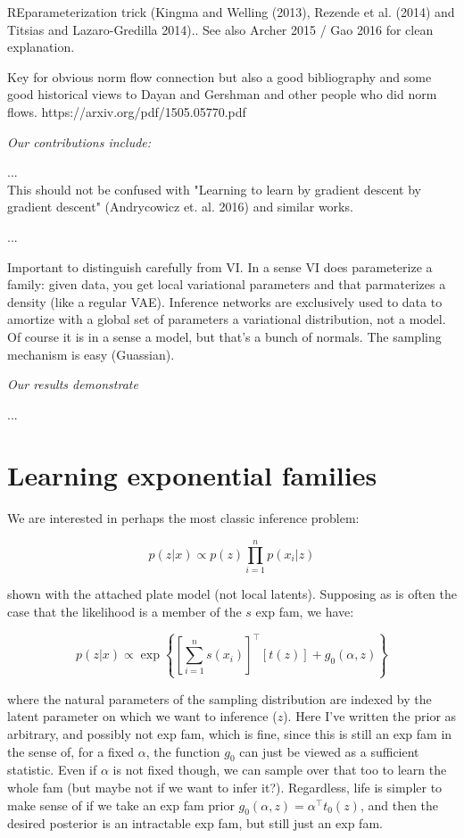 \documentclass{article}
\begin{document}
REparameterization trick (Kingma and Welling (2013), Rezende et al. (2014) and Titsias and Lazaro-Gredilla 2014)..  See also Archer 2015 / Gao 2016 for clean explanation.  
 
 Key for obvious norm flow connection but also a good bibliography and some good historical views to Dayan and Gershman and other people who did norm flows.  https://arxiv.org/pdf/1505.05770.pdf
 
\emph{Our contributions include:}


... \\
This should not be confused with "Learning to learn by gradient descent by gradient descent" (Andrycowicz et. al. 2016) and similar works.

...

Important to distinguish carefully from VI.  In a sense VI does parameterize a family: given data, you get local variational parameters and that parmaterizes a density (like a regular VAE).  Inference networks are exclusively used to data to amortize with a global set of parameters a variational distribution, not a model.  Of course it is in a sense a model, but that's a bunch of normals.  The sampling mechanism is easy (Guassian).  

\emph{Our results demonstrate}

...

  
 \section{Learning exponential families}
 
 
We are interested in perhaps the most classic inference problem:

$$p(z | x) \propto p(z) \prod_{i=1}^n p(x_i | z)$$

 shown with the attached plate model (not local latents).  Supposing as is often the case that the likelihood is a member of the $s$ exp fam, we have:
 
 $$p(z | x ) \propto \exp\left\{ \left[ \sum_{i=1}^n s(x_i) \right]^\top\left[ t(z) \right] + g_0(\alpha,z) \right\}$$
 
 where the natural parameters of the sampling distribution are indexed by the latent parameter on which we want to inference ($z$).  Here I've written the prior as arbitrary, and possibly not exp fam, which is fine, since this is still an exp fam in the  sense of, for a fixed $\alpha$, the function $g_0$ can just be viewed as a sufficient statistic.  Even if $\alpha$ is not fixed though, we can sample over that too to learn the whole fam (but maybe not if we want to infer it?).  Regardless, life is simpler to make sense of if we take an exp fam prior $g_0(\alpha,z) = \alpha^\top t_0(z)$, and then the desired posterior is an intractable exp fam, but still just an exp fam.
 
\end{document}
